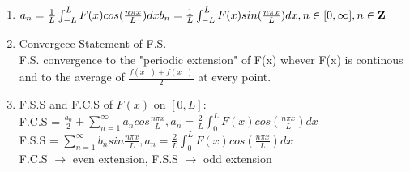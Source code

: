 \documentclass[10pt]{article}
\newcommand{\Z}{\mathbf{Z}}
\begin{document}
\begin{multicols}{2}
\begin{enumerate}
\begin{enumerate}
		\item $a_n = \frac{1}{L}\int_{-L}^{L}F(x)cos(\frac{n\pi x}{L})dx\\
		b_n = \frac{1}{L}\int_{-L}^{L}F(x)sin(\frac{n\pi x}{L})dx, n \in [0, \infty], n \in \Z$
		
		\item Convergece Statement of F.S.\\
		F.S. convergence to the "periodic extension" of F(x) whever F(x) is continous and to the average of $\frac{f(x^+)+f(x^-)}{2}$ at every point.
		
		\item F.S.S and F.C.S of $F(x)$ on $[0,L]$:\\
		F.C.S = $\frac{a_0}{2} + \sum_{n=1}^{\infty}a_ncos\frac{n\pi x}{L},
		a_n = \frac{2}{L}\int_{0}^{L}F(x)cos(\frac{n\pi x}{L})dx$\\
		F.S.S = $\sum_{n=1}^{\infty}b_nsin\frac{n\pi x}{L},
		a_n = \frac{2}{L}\int_{0}^{L}F(x)cos(\frac{n\pi x}{L})dx$\\
		F.C.S $\rightarrow$ even extension, F.S.S $\rightarrow$ odd extension
	\end{enumerate}


\end{enumerate}
\end{multicols}
\end{document}

